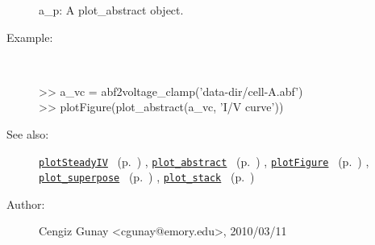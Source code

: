 \begin{description}
   a\_p: A plot\_abstract object.
%
\item[Example:]~
\begin{lyxcode} >> a\_vc = abf2voltage\_clamp('data-dir/cell-A.abf')
\\%
 >> plotFigure(plot\_abstract(a\_vc, 'I/V curve'))
\\%
\end{lyxcode}
%
\item[See also:]%
\hyperlink{ref_plotSteadyIV}{\texttt{plotSteadyIV}}%
\ (p.~\pageref{ref_plotSteadyIV})%
%
, \hyperlink{ref_plot_abstract}{\texttt{plot\_abstract}}%
\ (p.~\pageref{ref_plot_abstract})%
%
, \hyperlink{ref_plotFigure}{\texttt{plotFigure}}%
\ (p.~\pageref{ref_plotFigure})%
%
, \hyperlink{ref_plot_superpose}{\texttt{plot\_superpose}}%
\ (p.~\pageref{ref_plot_superpose})%
%
, \hyperlink{ref_plot_stack}{\texttt{plot\_stack}}%
\ (p.~\pageref{ref_plot_stack})%
%
%
\item[Author:]%
Cengiz Gunay <cgunay@emory.edu>, 2010/03/11
%
\end{description}
\methodline%
